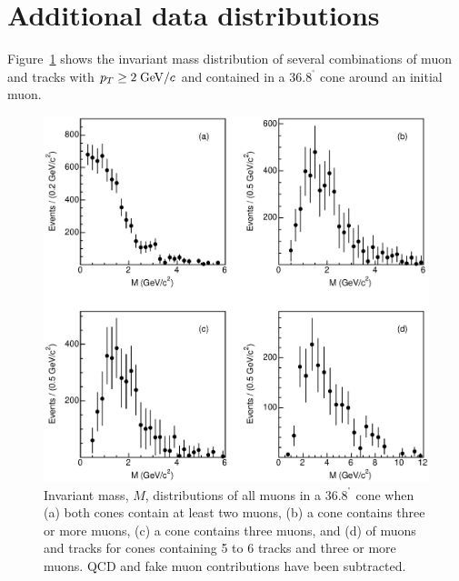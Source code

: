 \documentclass[aps,prd,preprint,floatfix,nofootinbib,superscriptaddress,showpacs,amssymb]{revtex4}
\def\deg{^\circ}
\begin{document}
\section{Additional data distributions}
 Figure~\ref{fig:fig_18} shows the invariant mass distribution of several combinations of
 muon and tracks with $p_T \geq 2 \; {\rm GeV/}c$ and contained in a $36.8^{\deg}$
 cone around an initial muon.
 \begin{figure}
 \begin{center}
 \vspace{-0.3in}
 \leavevmode
 \includegraphics*[width=\textwidth]{fa0_18_nosim.eps}
 \caption[]{Invariant mass, $M$, distributions of all muons in a $36.8^{\deg}$
            cone when (a) both cones contain at least two muons, (b) a cone
            contains three or more muons, (c) a cone contains three muons,
            and (d) of muons and tracks for cones containing 5 to 6 tracks
            and three or more muons. QCD and fake muon contributions have been
            subtracted.} 
 \label{fig:fig_18}
 \end{center}
 \end{figure}
\end{document}
